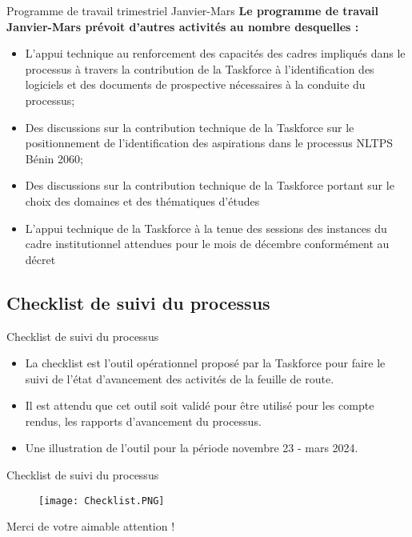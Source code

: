 \documentclass[11pt]{beamer}
\begin{document}
\begin{frame}{Programme de travail trimestriel Janvier-Mars}
\textbf{Le programme de travail Janvier-Mars prévoit d’autres activités au nombre desquelles :}  \vfill 
\begin{itemize} [<+->]
\item  L’appui technique au renforcement des capacités des cadres impliqués dans le processus à travers la contribution de la Taskforce à l’identification des logiciels et des documents de prospective nécessaires à la conduite du processus;   \vfill
\item Des discussions sur la contribution technique de la Taskforce sur le positionnement de l’identification des aspirations dans le processus NLTPS Bénin 2060;  \vfill
\item Des discussions sur la contribution technique de la Taskforce portant sur le choix des domaines et des thématiques d’études  \vfill
\item L’appui technique de la Taskforce à la tenue des sessions des instances du cadre institutionnel attendues pour le mois de décembre conformément au décret \vfill
 \end{itemize}
\end{frame}

\subsection{\tiny Checklist de suivi du processus}
\begin{frame}{Checklist de suivi du processus}
\begin{itemize} [<+->]
\item La checklist est l’outil opérationnel proposé par la Taskforce pour faire le suivi de l’état d’avancement des activités de la feuille de route.  \vfill
\item Il est attendu que cet outil soit validé pour être utilisé pour les compte rendus, les rapports d’avancement du processus.\vfill
\item Une illustration de l’outil pour la période novembre 23 - mars 2024.  \vfill
\end{itemize}
\end{frame}


\begin{frame}{Checklist de suivi du processus}
\begin{figure}[t]
\texttt{[image: Checklist.PNG]}
\end{figure}
\end{frame}

\begin{frame}
\begin{center}
\LARGE Merci de votre aimable attention !
\end{center}
\end{frame}

\begin{frame}
\titlepage
\end{frame}
\end{document}

